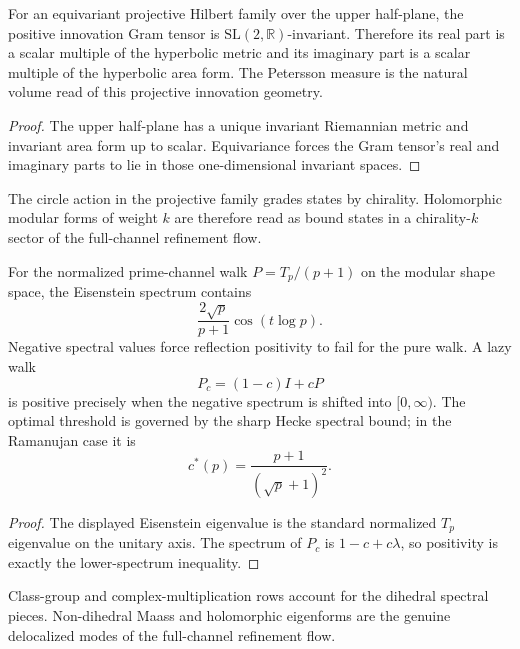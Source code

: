 \begin{theorem}
\label{thm:innovation-input-modular-petersson-innovation-geometry}
For an equivariant projective Hilbert family over the upper half-plane,
the positive innovation Gram tensor is
$\mathrm{SL}(2,\mathbb R)$-invariant. Therefore its real part is a scalar
multiple of the hyperbolic metric and its imaginary part is a scalar
multiple of the hyperbolic area form. The Petersson measure is the natural
volume read of this projective innovation geometry.
\end{theorem}

\begin{proof}
The upper half-plane has a unique invariant Riemannian metric and invariant
area form up to scalar. Equivariance forces the Gram tensor's real and
imaginary parts to lie in those one-dimensional invariant spaces.
\end{proof}

\begin{principle}
\label{prin:innovation-input-modular-weight-as-chirality}
The circle action in the projective family grades states by chirality.
Holomorphic modular forms of weight $k$ are therefore read as bound states
in a chirality-$k$ sector of the full-channel refinement flow.
\end{principle}

\begin{theorem}
\label{thm:innovation-input-modular-ramanujan-threshold}
For the normalized prime-channel walk $P=T_p/(p+1)$ on the modular shape
space, the Eisenstein spectrum contains
$$
\frac{2\sqrt p}{p+1}\cos(t\log p).
$$
Negative spectral values force reflection positivity to fail for the pure
walk. A lazy walk
$$
P_c=(1-c)I+cP
$$
is positive precisely when the negative spectrum is shifted into
$[0,\infty)$. The optimal threshold is governed by the sharp Hecke spectral
bound; in the Ramanujan case it is
$$
c^*(p)=\frac{p+1}{(\sqrt p+1)^2}.
$$
\end{theorem}

\begin{proof}
The displayed Eisenstein eigenvalue is the standard normalized
$T_p$ eigenvalue on the unitary axis. The spectrum of $P_c$ is
$1-c+c\lambda$, so positivity is exactly the lower-spectrum inequality.
\end{proof}

\begin{principle}
\label{prin:innovation-input-modular-dihedral-boundary}
Class-group and complex-multiplication rows account for the dihedral
spectral pieces. Non-dihedral Maass and holomorphic eigenforms are the
genuine delocalized modes of the full-channel refinement flow.
\end{principle}

